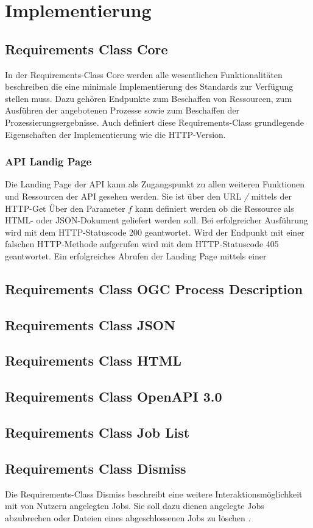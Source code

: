 \newpage
\restoregeometry
\section{Implementierung}
\subsection{Requirements Class Core}
In der Requirements-Class Core werden alle wesentlichen Funktionalitäten beschreiben die eine minimale Implementierung des Standards zur Verfügung stellen muss. 
Dazu gehören Endpunkte zum Beschaffen von Ressourcen, zum Ausführen der angebotenen Prozesse sowie zum Beschaffen der Prozessierungsergebnisse. Auch definiert diese 
Requirements-Class grundlegende Eigenschaften der Implementierung wie die HTTP-Version. 
\subsubsection{API Landig Page}
Die Landing Page der API kann als Zugangspunkt zu allen weiteren Funktionen und Ressourcen der API gesehen werden. Sie ist über den URL \textit{/} mittels der HTTP-Get
Über den Parameter $f$ kann definiert werden ob die Ressource als HTML- oder JSON-Dokument geliefert werden soll. Bei erfolgreicher Ausführung wird mit dem HTTP-Statuscode
200 geantwortet. Wird der Endpunkt mit einer falschen HTTP-Methode aufgerufen wird mit dem HTTP-Statuscode 405 geantwortet. 
Ein erfolgreiches Abrufen der Landing Page mittels einer

\subsection{Requirements Class OGC Process Description}
\subsection{Requirements Class JSON}
\subsection{Requirements Class HTML}
\subsection{Requirements Class OpenAPI 3.0}
\subsection{Requirements Class Job List}
\subsection{Requirements Class Dismiss}
Die Requirements-Class Dismiss beschreibt eine weitere Interaktionsmöglichkeit mit von Nutzern angelegten Jobs. Sie soll dazu dienen angelegte Jobs abzubrechen oder 
Dateien eines abgeschlossenen Jobs zu löschen \cite{ogc_api_processes_core}. 
